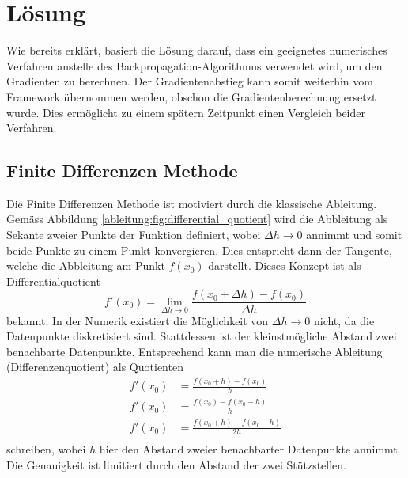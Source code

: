 %
%
%
\section{Lösung
\label{ableitung:section:loesung}}
Wie bereits erklärt, basiert die Lösung darauf, dass ein geeignetes numerisches Verfahren anstelle des Backpropagation-Algorithmus verwendet wird, um den Gradienten zu berechnen. Der Gradientenabstieg kann somit weiterhin vom Framework übernommen werden, obschon die Gradientenberechnung ersetzt wurde. Dies ermöglicht zu einem spätern Zeitpunkt einen Vergleich beider Verfahren.
\subsection{Finite Differenzen Methode}
Die Finite Differenzen Methode ist motiviert durch die klassische Ableitung. Gemäss Abbildung \ref{ableitung:fig:differential_quotient} wird die Abbleitung als Sekante zweier Punkte der Funktion definiert, wobei $\Delta h \rightarrow 0$ annimmt und somit beide Punkte zu einem Punkt konvergieren. Dies entspricht dann der Tangente, welche die Abbleitung am Punkt $f(x_0)$ darstellt.
Dieses Konzept ist als Differentialquotient
\begin{equation}
f'(x_0) = \lim_{{\Delta h} \rightarrow 0} \frac{f(x_0+\Delta h) - f(x_0)}{\Delta h}
\label{ableitung:equations:differentialquotient}
\end{equation}
bekannt. 
In der Numerik existiert die Möglichkeit von $\Delta h \rightarrow 0$ nicht, da die Datenpunkte diskretisiert sind. Stattdessen ist der kleinstmögliche Abstand zwei benachbarte Datenpunkte. Entsprechend kann man die numerische Ableitung (Differenzenquotient) als Quotienten
\begin{equation}
\begin{split}
f'(x_0) &= \frac{f(x_0 + h) - f(x_0)}{h} \\
f'(x_0) &= \frac{f(x_0) - f(x_0 - h)}{h} \\
f'(x_0) &= \frac{f(x_0 + h) - f(x_0 - h)}{2h} \\
\end{split}
\label{ableitung:equations:differenzenquotient}
\end{equation}
schreiben, wobei $h$ hier den Abstand zweier benachbarter Datenpunkte annimmt. Die Genauigkeit ist limitiert durch den Abstand der zwei Stützstellen.
